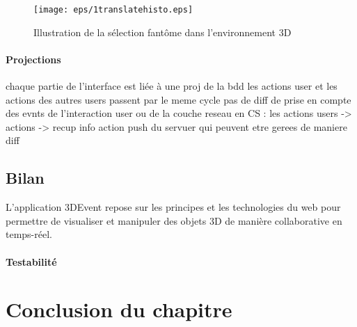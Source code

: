 \begin{figure}[ht]
	\centering
	\texttt{[image: eps/1translatehisto.eps]}
	\caption{Illustration de la sélection fantôme dans l'environnement 3D}
	\label{fig:ghostselection}
\end{figure}

\paragraph{Projections}
chaque partie de l’interface est liée à une proj de la bdd
les actions user et les actions des autres users passent par le meme cycle
pas de diff de prise en compte des evnts de l’interaction user ou de la couche 
reseau
en CS : les actions users -> actions -> recup info
action push du servuer qui peuvent etre gerees de maniere diff
\subsection{Bilan}

L'application 3DEvent repose sur les principes et les 
technologies du web pour permettre de visualiser et manipuler des objets \gls{3D} 
de 
manière 
collaborative en temps-réel.
\paragraph{Testabilité}
\section{Conclusion du chapitre}